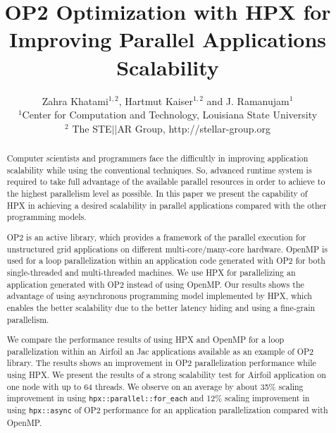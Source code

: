 \documentclass[conference]{IEEEtran}
\begin{document}





%

\title{OP2 Optimization with HPX for Improving Parallel Applications Scalability}
\author{Zahra Khatami$^{1,2}$, Hartmut Kaiser$^{1,2}$ and J. Ramanujam$^{1}$ \\$^{1}$Center for Computation and Technology, Louisiana State University\\$^{2}$ The STE$||$AR Group, http://stellar-group.org
}
   
\maketitle

\begin{abstract}

Computer scientists and programmers face the difficultly in improving application scalability while using the conventional techniques. So, advanced runtime system is required to take full advantage of the available parallel resources in order to achieve to the highest parallelism level as possible. In this paper we present the capability of HPX in achieving a desired scalability in parallel applications compared with the other programming models. 

OP2 is an active library, which provides a framework of the parallel execution for unstructured grid applications on different multi-core/many-core hardware.  OpenMP is used for a loop parallelization within an application code generated with OP2 for both single-threaded and multi-threaded machines. We use HPX for parallelizing an application generated with OP2 instead of using OpenMP. Our results shows the advantage of using asynchronous programming model implemented by HPX, which enables the better scalability due to the better latency hiding and using a fine-grain parallelism.

We compare the performance results of using HPX and OpenMP for a loop parallelization within an Airfoil an Jac applications available as an example of OP2 library. The results shows an improvement in OP2 parallelization performance while using HPX. We present the results of a strong scalability test for Airfoil application on one node with up to 64 threads. We observe on an average by about 35\% scaling improvement in using \texttt{hpx::parallel::for\_each} and 12\% scaling improvement in using \texttt{hpx::async} of OP2 performance for an application parallelization compared with OpenMP.

\end{abstract}
\end{document}
